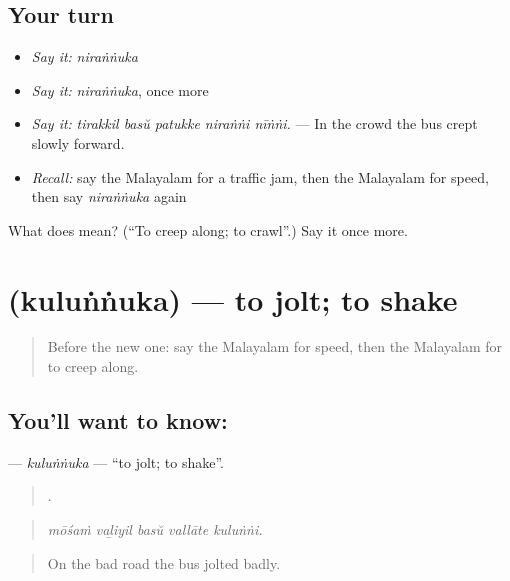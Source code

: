 \subsection*{Your turn}
\begin{itemize}
\raggedright
  \item \emph{Say it:} \emph{niraṅṅuka}
  \item \emph{Say it:} \emph{niraṅṅuka}, once more
  \item \emph{Say it:} \emph{tirakkil basŭ patukke niraṅṅi nīṅṅi.} — In the crowd the bus crept slowly forward.
  \item \emph{Recall:} say the Malayalam for a traffic jam, then the Malayalam for speed, then say \emph{niraṅṅuka} again
\end{itemize}

\begin{tcolorbox}[breakable,colback=teal!4,colframe=teal!35!black,title={Before you move on}]
What does  mean? (\textquotedblleft{}To creep along; to crawl\textquotedblright{}.) Say it once more.
\end{tcolorbox}
\section[\texorpdfstring{\ml{കുലുങ്ങുക} (kuluṅṅuka)}{കുലുങ്ങുക (kuluṅṅuka)}]{ (kuluṅṅuka) — to jolt; to shake}

\label{lesson:ML-C472-kulunnuka}



\begin{quote}
Before the new one: say the Malayalam for speed, then the Malayalam for to creep along.
\end{quote}

\subsection*{You'll want to know: }
\textbf{} — \emph{kuluṅṅuka} — \textquotedblleft{}to jolt; to shake\textquotedblright{}.

\begin{quote}
    .
\end{quote}

\begin{quote}
\emph{mōśaṁ vaḻiyil basŭ vallāte kuluṅṅi.}
\end{quote}

\begin{quote}
On the bad road the bus jolted badly.
\end{quote}

